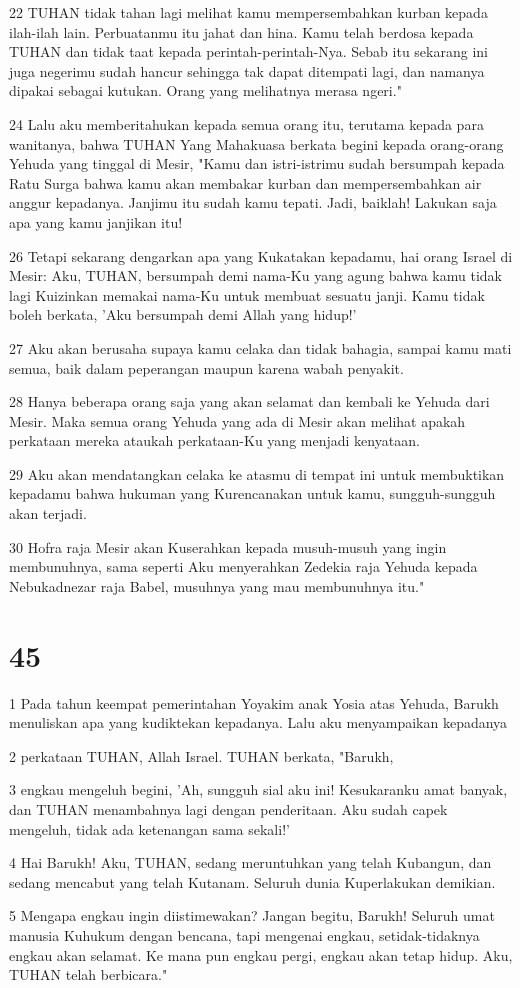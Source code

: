 \par 22 TUHAN tidak tahan lagi melihat kamu mempersembahkan kurban kepada ilah-ilah lain. Perbuatanmu itu jahat dan hina. Kamu telah berdosa kepada TUHAN dan tidak taat kepada perintah-perintah-Nya. Sebab itu sekarang ini juga negerimu sudah hancur sehingga tak dapat ditempati lagi, dan namanya dipakai sebagai kutukan. Orang yang melihatnya merasa ngeri."
\par 24 Lalu aku memberitahukan kepada semua orang itu, terutama kepada para wanitanya, bahwa TUHAN Yang Mahakuasa berkata begini kepada orang-orang Yehuda yang tinggal di Mesir, "Kamu dan istri-istrimu sudah bersumpah kepada Ratu Surga bahwa kamu akan membakar kurban dan mempersembahkan air anggur kepadanya. Janjimu itu sudah kamu tepati. Jadi, baiklah! Lakukan saja apa yang kamu janjikan itu!
\par 26 Tetapi sekarang dengarkan apa yang Kukatakan kepadamu, hai orang Israel di Mesir: Aku, TUHAN, bersumpah demi nama-Ku yang agung bahwa kamu tidak lagi Kuizinkan memakai nama-Ku untuk membuat sesuatu janji. Kamu tidak boleh berkata, 'Aku bersumpah demi Allah yang hidup!'
\par 27 Aku akan berusaha supaya kamu celaka dan tidak bahagia, sampai kamu mati semua, baik dalam peperangan maupun karena wabah penyakit.
\par 28 Hanya beberapa orang saja yang akan selamat dan kembali ke Yehuda dari Mesir. Maka semua orang Yehuda yang ada di Mesir akan melihat apakah perkataan mereka ataukah perkataan-Ku yang menjadi kenyataan.
\par 29 Aku akan mendatangkan celaka ke atasmu di tempat ini untuk membuktikan kepadamu bahwa hukuman yang Kurencanakan untuk kamu, sungguh-sungguh akan terjadi.
\par 30 Hofra raja Mesir akan Kuserahkan kepada musuh-musuh yang ingin membunuhnya, sama seperti Aku menyerahkan Zedekia raja Yehuda kepada Nebukadnezar raja Babel, musuhnya yang mau membunuhnya itu."

\chapter{45}

\par 1 Pada tahun keempat pemerintahan Yoyakim anak Yosia atas Yehuda, Barukh menuliskan apa yang kudiktekan kepadanya. Lalu aku menyampaikan kepadanya
\par 2 perkataan TUHAN, Allah Israel. TUHAN berkata, "Barukh,
\par 3 engkau mengeluh begini, 'Ah, sungguh sial aku ini! Kesukaranku amat banyak, dan TUHAN menambahnya lagi dengan penderitaan. Aku sudah capek mengeluh, tidak ada ketenangan sama sekali!'
\par 4 Hai Barukh! Aku, TUHAN, sedang meruntuhkan yang telah Kubangun, dan sedang mencabut yang telah Kutanam. Seluruh dunia Kuperlakukan demikian.
\par 5 Mengapa engkau ingin diistimewakan? Jangan begitu, Barukh! Seluruh umat manusia Kuhukum dengan bencana, tapi mengenai engkau, setidak-tidaknya engkau akan selamat. Ke mana pun engkau pergi, engkau akan tetap hidup. Aku, TUHAN telah berbicara."

